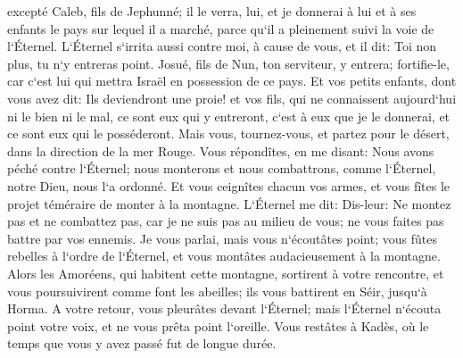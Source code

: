 \verse excepté Caleb, fils de Jephunné; il le verra, lui, et je donnerai à lui et à ses enfants le pays sur lequel il a marché, parce qu`il a pleinement suivi la voie de l`Éternel. 
\verse L`Éternel s`irrita aussi contre moi, à cause de vous, et il dit: Toi non plus, tu n`y entreras point. 
\verse Josué, fils de Nun, ton serviteur, y entrera; fortifie-le, car c`est lui qui mettra Israël en possession de ce pays. 
\verse Et vos petits enfants, dont vous avez dit: Ils deviendront une proie! et vos fils, qui ne connaissent aujourd`hui ni le bien ni le mal, ce sont eux qui y entreront, c`est à eux que je le donnerai, et ce sont eux qui le posséderont. 
\verse Mais vous, tournez-vous, et partez pour le désert, dans la direction de la mer Rouge. 
\verse Vous répondîtes, en me disant: Nous avons péché contre l`Éternel; nous monterons et nous combattrons, comme l`Éternel, notre Dieu, nous l`a ordonné. Et vous ceignîtes chacun vos armes, et vous fîtes le projet téméraire de monter à la montagne. 
\verse L`Éternel me dit: Dis-leur: Ne montez pas et ne combattez pas, car je ne suis pas au milieu de vous; ne vous faites pas battre par vos ennemis. 
\verse Je vous parlai, mais vous n`écoutâtes point; vous fûtes rebelles à l`ordre de l`Éternel, et vous montâtes audacieusement à la montagne. 
\verse Alors les Amoréens, qui habitent cette montagne, sortirent à votre rencontre, et vous poursuivirent comme font les abeilles; ils vous battirent en Séir, jusqu`à Horma. 
\verse A votre retour, vous pleurâtes devant l`Éternel; mais l`Éternel n`écouta point votre voix, et ne vous prêta point l`oreille. 
\verse Vous restâtes à Kadès, où le temps que vous y avez passé fut de longue durée. 

\chapter{}

